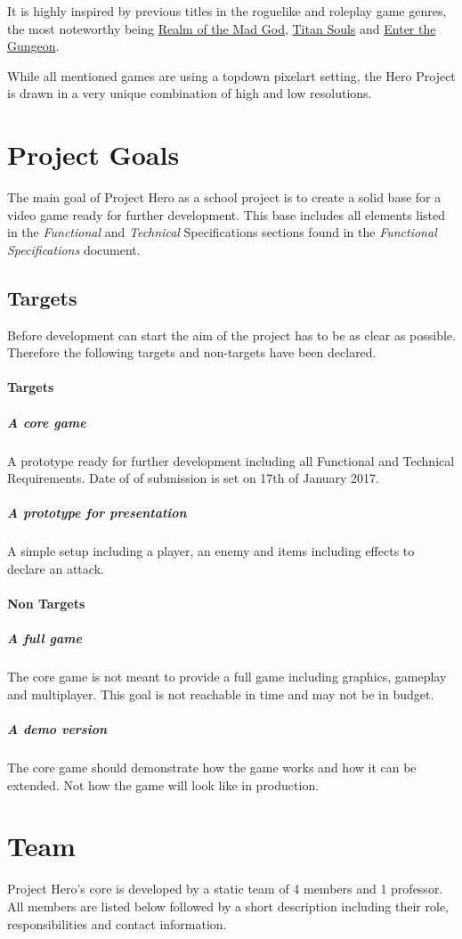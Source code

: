 \documentclass[11pt]{article}
\begin{document}
It is highly inspired by previous titles in the roguelike and roleplay game genres, the most noteworthy being \href{https://realmofthemadgod.com}{Realm of the Mad God}, \href{http://www.devolverdigital.com/games/view/titan-souls}{Titan Souls} and \href{http://dodgeroll.com/gungeon/}{Enter the Gungeon}.

While all mentioned games are using a topdown pixelart setting, the Hero Project is drawn in a very unique combination of high and low resolutions.

\section{Project Goals}
The main goal of Project Hero as a school project is to create a solid base for a video game ready for further development.
This base includes all elements listed in the \textit{Functional} and \textit{Technical} Specifications sections found in the \textit{Functional Specifications} document.

\subsection{Targets}
Before development can start the aim of the project has to be as clear as possible. Therefore the following targets and non-targets have been declared.
\paragraph{Targets}
\subparagraph{A core game} A prototype ready for further development including all Functional and Technical Requirements. Date of of submission is set on 17th of January 2017.
\subparagraph{A prototype for presentation} A simple setup including a player, an enemy and items including effects to declare an attack.

\paragraph{Non Targets}
\subparagraph{A full game} The core game is not meant to provide a full game including graphics, gameplay and multiplayer. This goal is not reachable in time and may not be in budget.
\subparagraph{A demo version} The core game should demonstrate how the game works and how it can be extended. Not how the game will look like in production.

\newpage

\section{Team}
Project Hero's core is developed by a static team of 4 members and 1 professor. All members are listed below followed by a short description including their role, responsibilities and contact information.
\end{document}
